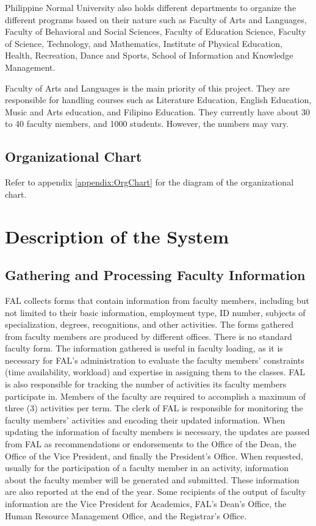 Philippine Normal University also holds different departments to organize the different programs based on their nature such as Faculty of Arts and Languages, Faculty of Behavioral and Social Sciences, Faculty of Education Science, Faculty of Science, Technology, and Mathematics, Institute of Physical Education, Health, Recreation, Dance and Sports, School of Information and Knowledge Management.

Faculty of Arts and Languages is the main priority of this project. They are responsible for handling courses such as Literature Education, English Education, Music and Arts education, and Filipino Education. They currently have about 30 to 40 faculty members, and 1000 students. However, the numbers may vary.

\subsection{Organizational Chart}
Refer to appendix \ref{appendix:OrgChart} for the diagram of the organizational chart.

\section{Description of the System}

\subsection{Gathering and Processing Faculty Information}

FAL collects forms that contain information from faculty members, including but not limited to their basic information, employment type, ID number, subjects of specialization, degrees, recognitions, and other activities. The forms gathered from faculty members are produced by different offices. There is no standard faculty form. The information gathered is useful in faculty loading, as it is necessary for FAL's administration to evaluate the faculty members' constraints (time availability, workload) and expertise in assigning them to the classes. FAL is also responsible for tracking the number of activities its faculty members participate in. Members of the faculty are required to accomplish a maximum of three (3) activities per term. The clerk of FAL is responsible for monitoring the faculty members' activities and encoding their updated information. When updating the information of faculty members is necessary, the updates are passed from FAL as recommendations or endorsements to the Office of the Dean, the Office of the Vice President, and finally the President's Office. When requested, usually for the participation of a faculty member in an activity, information about the faculty member will be generated and submitted. These information are also reported at the end of the year. Some recipients of the output of faculty information are the Vice President for Academics, FAL's Dean's Office, the Human Resource Management Office, and the Registrar's Office.

